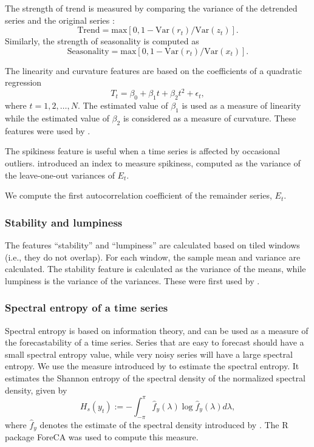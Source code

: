 \documentclass[11pt,a4paper,]{article}
\def\var{\text{Var}}
\theoremstyle{definition}
\theoremstyle{definition}
\theoremstyle{definition}
\theoremstyle{remark}
\begin{document}
The strength of trend is measured by comparing the variance of the
detrended series and the original series \autocite{wang2009rule}: \[
    \text{Trend} = \text{max}\left[0, 1 - \var(r_{t})/\var(z_{t})\right].
\] Similarly, the strength of seasonality is computed as \[
    \text{Seasonality} = \text{max}\left[0, 1- \var(r_{t})/ \var(x_{t})\right].
\]

The linearity and curvature features are based on the coefficients of a
quadratic regression \[
  T_t=\beta_0+\beta_1 t + \beta_2t^2+\epsilon_t,
\] where \(t=1, 2, \dots,N\). The estimated value of \(\beta_1\) is used
as a measure of linearity while the estimated value of \(\beta_2\) is
considered as a measure of curvature. These features were used by
\textcite{hyndman2015large}.

The spikiness feature is useful when a time series is affected by
occasional outliers. \textcite{hyndman2015large} introduced an index to
measure spikiness, computed as the variance of the leave-one-out
variances of \(E_t\).

We compute the first autocorrelation coefficient of the remainder
series, \(E_t\).

\subsubsection*{Stability and lumpiness}\label{stability-and-lumpiness}

The features ``stability'' and ``lumpiness'' are calculated based on
tiled windows (i.e., they do not overlap). For each window, the sample
mean and variance are calculated. The stability feature is calculated as
the variance of the means, while lumpiness is the variance of the
variances. These were first used by \textcite{hyndman2015large}.

\subsubsection*{Spectral entropy of a time
series}\label{spectral-entropy-of-a-time-series}

Spectral entropy is based on information theory, and can be used as a
measure of the forecastability of a time series. Series that are easy to
forecast should have a small spectral entropy value, while very noisy
series will have a large spectral entropy. We use the measure introduced
by \textcite{goerg2013forecastable} to estimate the spectral entropy. It
estimates the Shannon entropy of the spectral density of the normalized
spectral density, given by \[ 
  H_{s}(y_t):=-\int_{-\pi}^{\pi}\hat f_y(\lambda)\log \hat f_y({\lambda})d\lambda,
\] where \(\hat{f}_y\) denotes the estimate of the spectral density
introduced by \textcite{nuttall1982spectral}. The R package ForeCA
\autocite{Foreca} was used to compute this measure.
\end{document}
